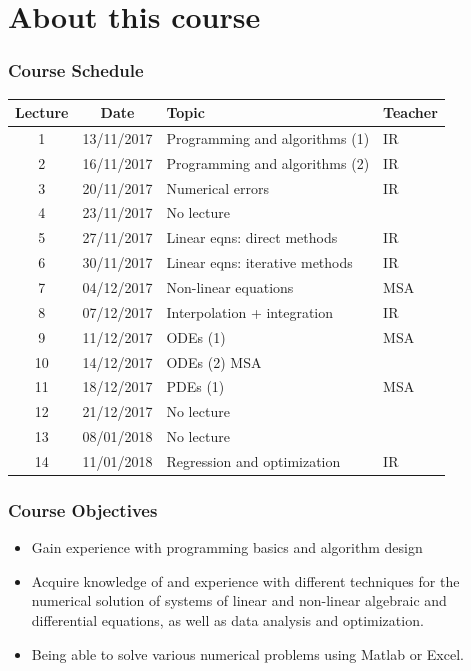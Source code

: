 \documentclass[11pt,table,final,fleqn,xcolor={usenames,dvipsnames},handout]{beamer}
\begin{document}
\section{About this course}
\begin{frame}
 \frametitle{Course Schedule}
 \begin{tabular}{ccll}
 \hline
 Lecture & Date & Topic & Teacher \\ 
 \hline
 1 & 13/11/2017 & Programming and algorithms (1) & IR \\ 
 2 & 16/11/2017 & Programming and algorithms (2) & IR \\ 
 3 & 20/11/2017 & Numerical errors & IR\\ 
 4 & 23/11/2017 & No lecture & \\ 
 5 & 27/11/2017 & Linear eqns: direct methods  & IR\\ 
 6 & 30/11/2017 & Linear eqns: iterative methods & IR\\ 
 7 & 04/12/2017 & Non-linear equations & MSA\\ 
 8 & 07/12/2017 & Interpolation + integration & IR\\ 
 9 & 11/12/2017 & ODEs (1) & MSA\\ 
 10 & 14/12/2017 & ODEs (2) MSA & \\
 11 & 18/12/2017 & PDEs (1) & MSA\\ 
 12 & 21/12/2017 & No lecture & \\ 
 13 & 08/01/2018 & No lecture &  \\ 
 14 & 11/01/2018 & Regression and optimization& IR\\ 
 \hline
 \end{tabular} 
\end{frame}

\begin{frame}
 \frametitle{Course Objectives}
 \begin{itemize}
  \item Gain experience with programming basics and algorithm design
  \item Acquire knowledge of and experience with different techniques for the numerical solution of systems of linear and non-linear algebraic and differential equations, as well as data analysis and optimization.
  \item Being able to solve various numerical problems using Matlab or Excel. 
 \end{itemize}
\end{frame}
\end{document}
